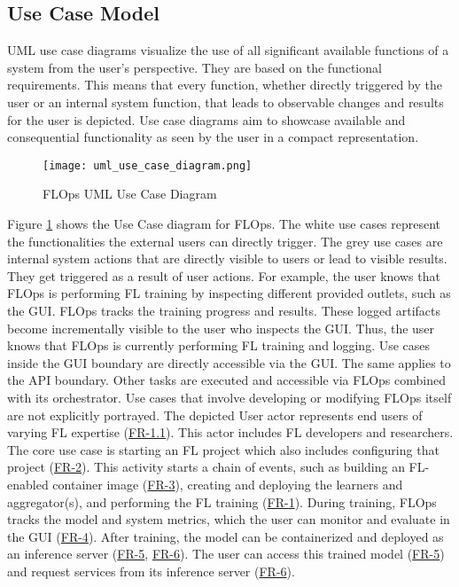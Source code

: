 \subsection{Use Case Model}

UML use case diagrams visualize the use of all significant available functions of a system from the user's perspective.
They are based on the functional requirements.
This means that every function, whether directly triggered by the user or an internal system function, that leads to observable changes and results for the user is depicted.
Use case diagrams aim to showcase available and consequential functionality as seen by the user in a compact representation. \cite{book:bruegge}

\begin{figure}[p]
    \begin{adjustwidth}{-0.1\paperwidth}{-0.1\paperwidth}
        \centering
        \texttt{[image: uml\_use\_case\_diagram.png]}
        \caption{FLOps UML Use Case Diagram}
        \label{fig:uml_use_case_diagram}
    \end{adjustwidth}
\end{figure}

Figure \ref{fig:uml_use_case_diagram} shows the Use Case diagram for FLOps.
The white use cases represent the functionalities the external users can directly trigger.
The grey use cases are internal system actions that are directly visible to users or lead to visible results.
They get triggered as a result of user actions.
For example, the user knows that FLOps is performing FL training by inspecting different provided outlets, such as the GUI.
FLOps tracks the training progress and results.
These logged artifacts become incrementally visible to the user who inspects the GUI.
Thus, the user knows that FLOps is currently performing FL training and logging.
Use cases inside the GUI boundary are directly accessible via the GUI. 
The same applies to the API boundary.
Other tasks are executed and accessible via FLOps combined with its orchestrator.
Use cases that involve developing or modifying FLOps itself are not explicitly portrayed.
The depicted User actor represents end users of varying FL expertise (\hyperref[FR-1.1]{FR-1.1}).
This actor includes FL developers and researchers.
The core use case is starting an FL project which also includes configuring that project (\hyperref[FR-2]{FR-2}).
This activity starts a chain of events, such as building an FL-enabled container image (\hyperref[FR-3]{FR-3}), creating and deploying the learners and aggregator(s), and performing the FL training (\hyperref[FR-1]{FR-1}).
During training, FLOps tracks the model and system metrics, which the user can monitor and evaluate in the GUI (\hyperref[FR-4]{FR-4}).
After training, the model can be containerized and deployed as an inference server (\hyperref[FR-5]{FR-5}, \hyperref[FR-6]{FR-6}).
The user can access this trained model (\hyperref[FR-5]{FR-5}) and request services from its inference server (\hyperref[FR-6]{FR-6}).
